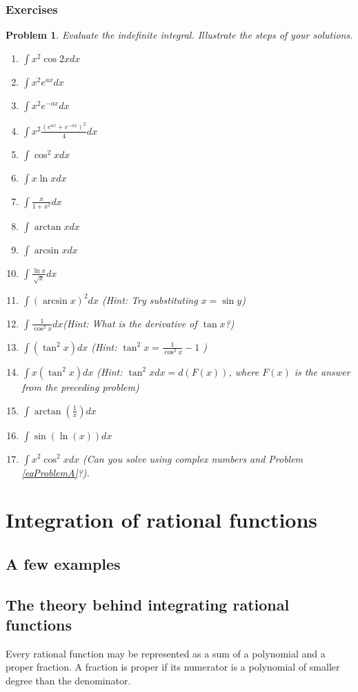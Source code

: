 \documentclass[12pt]{book}
\newtheorem{problem}{Problem}[section]
\begin{document}
\subsubsection{Exercises}
\begin{problem}
Evaluate the indefinite integral. Illustrate the steps of your solutions.
\begin{enumerate}
\item 
$\int x^2\cos 2x dx$
\item 
$\int x^2e^{ax}dx$
\item 
$\int x^2e^{-ax}dx$
\item \label{eqProblemA}
$\int x^2\frac{(e^{ax}+e^{-ax})^2}4dx$ 
\item 
$\int \cos^2x dx$ 
\item 
$ \int x\ln x dx 
$
\item $\int \frac{x}{1+x^2} dx$ 
\item 
$ \int \arctan x dx
$
\item 
$ \int \arcsin x dx
$
\item $\int \frac{\ln x}{\sqrt{x}}dx $
\item $\int (\arcsin x)^2 dx $ \quad \quad (Hint: Try substituting $x=\sin y$)
\item $\int \frac{1}{\cos^2 x}dx$\quad \quad (Hint: What is the derivative of $\tan x$?)
\item $\int (\tan^2 x) dx $ \quad \quad (Hint: $\tan^2 x = \frac{1}{\cos^2x }-1$ )
\item $\int x(\tan^2 x) dx $ \quad \quad (Hint: $\tan^2 x dx= d(F(x))$, where $F(x)$ is the answer from the preceding problem)
\item 
$
\int\arctan (\frac{1}x)dx
$
\item $\int \sin (\ln (x)) dx $
\item
$\int x^2\cos^2x dx$ (Can you solve using complex numbers and Problem \ref{eqProblemA}?).
\end{enumerate}
\end{problem}

\section{Integration of rational functions}

\subsection{A few examples}

\subsection{The theory behind integrating rational functions}
Every rational function may be represented as a sum of a polynomial and a proper fraction. A fraction is proper if its numerator is a polynomial of smaller degree than the denominator. 
\end{document}
